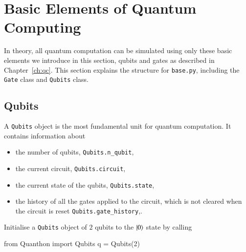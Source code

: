 \newpage
\section{Basic Elements of Quantum Computing}
\label{sec:base}
In theory, all quantum computation can be simulated using only these basic elements we introduce in this section, qubits and gates as described in Chapter~\ref{ch:qc}. 
This section explains the structure for \texttt{base.py}, including the \texttt{Gate} class and \texttt{Qubits} class.
\subsection{Qubits}
\label{sub:qubits}
A \texttt{Qubits} object is the most fundamental unit for quantum computation. It contains information about
\begin{itemize}
	\item the number of qubits, \texttt{Qubits.n\_qubit},
	\item the current circuit, \texttt{Qubits.circuit},
	\item the current state of the qubits, \texttt{Qubits.state},
	\item the history of all the gates applied to the circuit, which is not cleared when the circuit is reset \texttt{Qubits.gate\_history},.
\end{itemize}

Initialise a \texttt{Qubits} object of $ 2 $ qubits to the $ \ket{0} $ state by calling
\begin{mycode}
	from Quanthon import Qubits
	q = Qubits(2)
\end{mycode}
 


